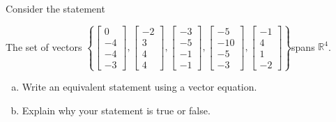 
\begin{exerciseStatement}


Consider the statement 
\begin{center}\begin{minipage}{0.8\textwidth}
 The set of vectors \( \left\{ \left[\begin{array}{c}
0 \\
-4 \\
-4 \\
-3
\end{array}\right] , \left[\begin{array}{c}
-2 \\
3 \\
4 \\
4
\end{array}\right] , \left[\begin{array}{c}
-3 \\
-5 \\
-1 \\
-1
\end{array}\right] , \left[\begin{array}{c}
-5 \\
-10 \\
-5 \\
-3
\end{array}\right] , \left[\begin{array}{c}
-1 \\
4 \\
1 \\
-2
\end{array}\right] \right\} \)spans \(\mathbb{R}^4\). 
\end{minipage}\end{center}
    


\begin{enumerate}[(a)]
\item  Write an equivalent statement using a vector equation.
\item  Explain why your statement is true or false.
\end{enumerate}
    
\end{exerciseStatement}
    
